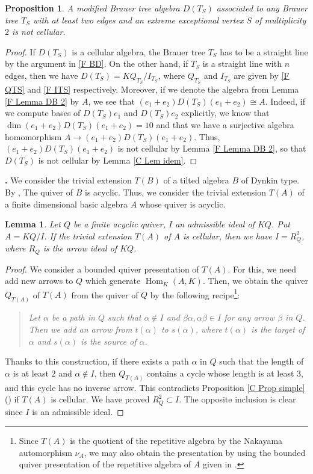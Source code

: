 \documentclass[12pt]{amsart}
\newtheorem{lem}[thm]{Lemma}
\newtheorem{prop}[thm]{Proposition}
\def \para{\refstepcounter{thm} \par\medskip\noindent
                \textbf{\thethm .} }
\numberwithin{equation}{thm}
\renewcommand\a{\alpha}  %
\renewcommand\b{\beta}   %
\newcommand\Hom{\operatorname{Hom}}
\newcounter{ni}
\newcounter{san}
\newcommand{\roiii}{\roman{san}}
\begin{document}
\begin{prop}
\label{F Prop MBD}
A modified Brauer tree algebra $D(T_S)$ 
associated to any Brauer tree $T_S$ 
with at least two edges and an extreme exceptional vertex $S$ of multiplicity $2$ 
is not cellular. 
\end{prop}
\begin{proof}
If $D (T_S)$ is a cellular algebra, 
the Brauer tree $T_S$ has to be a straight line by the argument in \ref{F BD}. 
On the other hand, 
if $T_S$ is a straight line with $n$ edges, 
then we have $D(T_S) = KQ_{T_S}/ I_{T_S}$, 
where $Q_{T_S}$ and $I_{T_S}$ are given by \eqref{F QTS} and \eqref{F ITS} respectively. 
Moreover, if we denote the algebra from Lemma \ref{F Lemma DB 2} by $A$,
we see that $(e_1+e_2)D(T_S)(e_1+e_2) \cong A$. 
Indeed, if we compute bases of $D(T_S)e_1$ and $D(T_S)e_2$ explicitly, we know that 
$\dim (e_1+e_2)D(T_S)(e_1+e_2) = 10$ 
and that we have a surjective algebra homomorphism $A \to (e_1+e_2)D(T_S)(e_1+e_2)$. 
Thus, $(e_1+e_2)D(T_S)(e_1+e_2)$ is not cellular by Lemma \ref{F Lemma DB 2}, 
so that $D(T_S)$ is not cellular by Lemma \ref{C Lem idem}. 
\end{proof}


\para 
We consider the trivial extension $T(B)$ of a tilted algebra $B$ of Dynkin type. 
By \cite[Corollary 3.4 in Chapter VIII]{ASS}, 
The quiver of $B$ is acyclic. 
Thus, we consider the trivial extension $T(A)$ of a finite dimensional basic algebra $A$ whose quiver is acyclic. 


\begin{lem}
\label{F Lemma TA}
Let $Q$ be a finite acyclic quiver, 
$I$ an admissible ideal of $K Q$. 
Put $A= KQ/I$. 
If the trivial extension $T(A)$ of $A$ is cellular, 
then we have $I= R^2_Q$, 
where $R_Q$ is the arrow ideal of $KQ$. 
\end{lem}

\begin{proof}
We consider a bounded quiver presentation of $T(A)$. 
For this, we need add new arrows to $Q$ which generate $\Hom_K(A,K)$. 
Then, we obtain 
the quiver $Q_{T(A)}$ of $T(A)$ from the quiver of $Q$ by the following 
recipe\footnote{Since $T(A)$ is the quotient of the repetitive algebra 
by the Nakayama automorphism $\nu_A$, 
we may also obtain the presentation by 
using the bounded quiver presentation of the repetitive algebra of $A$ 
given in \cite[Lemma 1.3]{A}.}: 
\begin{quote}
\it
Let $\a$ be a path in $Q$ such that $\a \not \in I$ and $\b \a, \a \b \in I$ for any arrow $\b$ in $Q$.
Then we add an arrow from $t(\a)$ to $s(\a)$, 
where $t(\a)$ is the target of $\a$ and $s(\a)$ is the source of $\a$.  
\end{quote}
Thanks to this construction, 
if there exists a path $\a$ in $Q$ such that the length of $\a$ is at least $2$ and $\a \not\in I$, 
then $Q_{T(A)}$ contains a cycle whose length is at least $3$, 
and this cycle has no inverse arrow. 
This contradicts Proposition \ref{C Prop simple} (\roiii) if $T(A)$ is cellular. 
We have proved $R_Q^2\subset I$. 
The opposite inclusion is clear since $I$ is an admissible ideal.
\end{proof}
\end{document}
